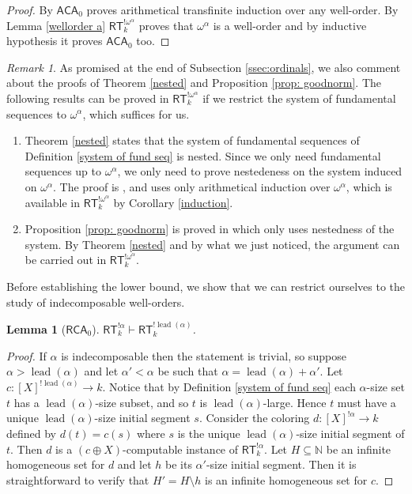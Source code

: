 \documentclass[11pt]{amsart}
\newtheorem{lemma}[thm]{Lemma}
\theoremstyle{definition}
\theoremstyle{remark}
\newtheorem{remark}[thm]{Remark}
\theoremstyle{plain}
\newcommand{\numberset}{\mathbb}
\newcommand{\N}{\numberset{N}}
\def\om{\omega}
\def\a{\alpha}
\newcommand{\RCA}{\mathsf{RCA}_0}
\newcommand{\ACA}{\mathsf{ACA}_0}
\newcommand{\RT}{\mathsf{RT}}
\newcommand{\lead}{\operatorname{lead}}
\def\N{{\mathbb{N}}}
\begin{document}
\begin{proof}
By \cite[Exercise 5.13.19]{dzhafarovmummert} $\ACA$ proves arithmetical transfinite induction over any well-order.
By Lemma \ref{wellorder a} $\RT^{! \om^\a}_k$ proves that $\om^\a$ is a well-order and by inductive hypothesis it proves $\ACA$ too. 
\end{proof}

\begin{remark}\label{technical lemmas}
As promised at the end of Subsection \ref{ssec:ordinals}, we also comment about the proofs of Theorem \ref{nested} and Proposition \ref{prop: goodnorm}.
The following results can be proved in $\RT^{! \om^\a}_k$ if we restrict the system of fundamental sequences to $\om^\a$, which suffices for us.
\begin{enumerate}
    \item Theorem \ref{nested} states that the system of fundamental sequences of Definition \ref{system of fund seq} is nested.
    Since we only need fundamental sequences up to $\om^\a$, we only need to prove nestedeness on the system induced on $\om^\a$.
    The proof is \cite[Theorem 2.16]{marcone2025}, and uses only arithmetical induction over $\om^\a$, which is available in $\RT^{! \om^\a}_k$ by Corollary \ref{induction}.
    \item Proposition \ref{prop: goodnorm} is proved in \cite[Proposition 2.12]{marcone2025} which only uses nestedness of the system.
    By Theorem \ref{nested} and by what we just noticed, the argument can be carried out in $\RT^{! \om^\a}_k$.
\end{enumerate}
\end{remark}

Before establishing the lower bound, we show that we can restrict ourselves to the study of indecomposable well-orders.

\begin{lemma}[$\RCA$]
$\RT^{! \alpha}_k \vdash \RT^{! \lead(\alpha)}_k$.
\end{lemma}

\begin{proof}
If $\alpha$ is indecomposable then the statement is trivial, so suppose $\alpha > \lead(\alpha)$ and let $\a' < \a$ be such that $\alpha = \lead(\alpha) + \a'$.
Let $c \colon [X]^{! \lead(\alpha)} \to k$.
Notice that by Definition \ref{system of fund seq} each $\alpha$-size set $t$ has a $\lead(\alpha)$-size subset, and so $t$ is $\lead(\alpha)$-large.
Hence $t$ must have a unique $\lead({\alpha})$-size initial segment $s$.  
Consider the coloring $d \colon [X]^{! \alpha} \to k$ defined by $d(t) = c(s)$ where $s$ is the unique $\lead(\alpha)$-size initial segment of $t$.
Then $d$ is a $(c \oplus X)$-computable instance of $\RT^{! \alpha}_k$.
Let $H\subseteq\N$ be an infinite homogeneous set for $d$ and let $h$ be its $\alpha'$-size initial segment.
Then it is straightforward to verify that $H' = H \setminus h$ is an infinite homogeneous set for $c$.
\end{proof}
\end{document}
